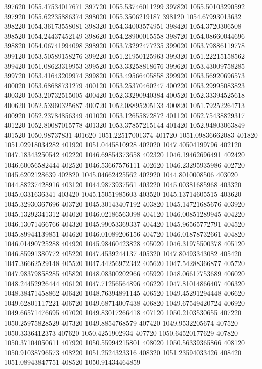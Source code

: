 {397620 1055.47534017671
397720 1055.53746011299
397820 1055.50103290592
397920 1055.62235886374
398020 1055.3506219187
398120 1054.67993013632
398220 1054.36173558081
398320 1054.34003574951
398420 1054.3720306508
398520 1054.24437452149
398620 1054.28900015558
398720 1054.08660044696
398820 1054.06741994098
398920 1053.73292477235
399020 1053.79886119778
399120 1053.50589158276
399220 1051.21950125963
399320 1051.22215158562
399420 1051.08623319953
399520 1053.33258818676
399620 1053.43009758285
399720 1053.41643209974
399820 1053.49566405858
399920 1053.56920696573
400020 1053.68688731279
400120 1053.25370460247
400220 1053.29995083823
400320 1053.20732515005
400420 1052.33290940384
400520 1052.33394525618
400620 1052.53960325687
400720 1052.08895205133
400820 1051.79252264713
400920 1052.23784856349
401020 1053.12655872872
401120 1052.75438829317
401220 1052.80087015778
401320 1053.37857215144
401420 1052.94803063849
401520 1050.98737831
401620 1051.22517001374
401720 1051.09836662083
401820 1051.02918034282
401920 1051.0445810928
402020 1047.40504199796
402120 1047.18343250542
402220 1046.69854373658
402320 1046.19462696491
402420 1046.60056582444
402520 1046.53667576111
402620 1046.23295935986
402720 1045.6202128639
402820 1045.04662425562
402920 1044.8010008506
403020 1044.88237428916
403120 1044.9873937561
403220 1045.00381685968
403320 1045.0331636341
403420 1045.15051985603
403520 1045.13714605515
403620 1045.32930367696
403720 1045.30143407192
403820 1045.14721685676
403920 1045.13292341312
404020 1046.02186563098
404120 1046.00851289945
404220 1046.13071466766
404320 1045.99053369337
404420 1045.96565772791
404520 1045.89944139851
404620 1046.01089206156
404720 1046.01878732661
404820 1046.01490725288
404920 1045.98460423828
405020 1046.31975500378
405120 1046.85991380772
405220 1047.4539244137
405320 1047.80493343082
405420 1047.36662529148
405520 1047.44256972342
405620 1047.54288366877
405720 1047.98379858285
405820 1048.08300202966
405920 1048.06617753689
406020 1048.24452926444
406120 1047.71256564896
406220 1047.81014866407
406320 1048.38471458862
406420 1048.76394891145
406520 1049.45291294448
406620 1049.62801117221
406720 1049.68714007438
406820 1049.67549420724
406920 1049.66571476695
407020 1049.83017266418
407120 1050.2103530655
407220 1050.25975828529
407320 1049.8854768579
407420 1049.9532205674
407520 1050.3336412373
407620 1050.4251902934
407720 1050.64520177629
407820 1050.37104050611
407920 1050.55994215801
408020 1050.56339365866
408120 1050.91038796573
408220 1051.2524323316
408320 1051.23594033426
408420 1051.08943847751
408520 1050.91434464859
}
